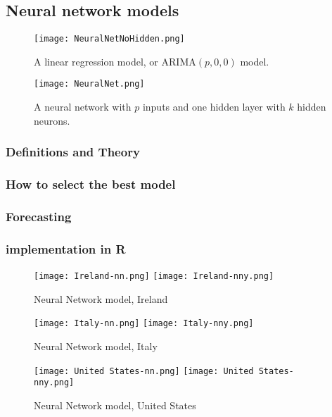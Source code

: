 \subsection{Neural network models}

\begin{figure}
\texttt{[image: NeuralNetNoHidden.png]}
\caption{A linear regression model, or ARIMA$(p,0,0)$ model.}
\end{figure}

\begin{figure}
\texttt{[image: NeuralNet.png]}
\caption{A neural network with $p$ inputs and one hidden layer with $k$ hidden neurons.}
\end{figure}

\subsubsection{Definitions and Theory}

\subsubsection{How to select the best model}

\subsubsection{Forecasting}

\subsubsection{implementation in R}

\begin{figure}[H]
  \texttt{[image: Ireland-nn.png]} \label{fig:ireland-nn}
\endminipage\hfill
{}
  \texttt{[image: Ireland-nny.png]} \label{fig:ireland-nny}
\endminipage
\caption{Neural Network model, Ireland}
\end{figure}

\begin{figure}[H]
  \texttt{[image: Italy-nn.png]} \label{fig:italy-nn}
\endminipage\hfill
{}
  \texttt{[image: Italy-nny.png]} \label{fig:italy-nny}
\endminipage
\caption{Neural Network model, Italy}
\end{figure}

\begin{figure}[H]
  \texttt{[image: United States-nn.png]} \label{fig:usa-nn}
\endminipage\hfill
{}
  \texttt{[image: United States-nny.png]} \label{fig:usa-nny}
\endminipage
\caption{Neural Network model, United States}
\end{figure}
